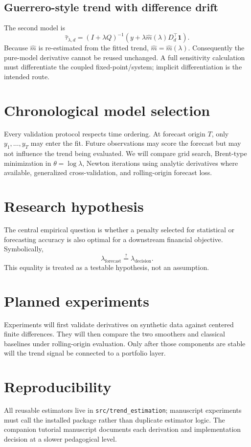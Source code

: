 \documentclass[11pt]{article}
\newcommand{\Dt}{D_d}
\begin{document}
\subsection{Guerrero-style trend with difference drift}
The second model is
\begin{equation}
\widehat\tau_{\lambda,d}
=(I+\lambda Q)^{-1}
\left(y+\lambda\widehat m(\lambda)\Dt^\top\mathbf 1\right).
\end{equation}
Because $\widehat m$ is re-estimated from the fitted trend,
$\widehat m=\widehat m(\lambda)$. Consequently the pure-model derivative cannot
be reused unchanged. A full sensitivity calculation must differentiate the
coupled fixed-point/system; implicit differentiation is the intended route.

\section{Chronological model selection}
Every validation protocol respects time ordering. At forecast origin $T$, only
$y_1,\ldots,y_T$ may enter the fit. Future observations may score the forecast
but may not influence the trend being evaluated. We will compare grid search,
Brent-type minimization in $\theta=\log\lambda$, Newton iterations using
analytic derivatives where available, generalized cross-validation, and
rolling-origin forecast loss.

\section{Research hypothesis}
The central empirical question is whether a penalty selected for statistical
or forecasting accuracy is also optimal for a downstream financial objective.
Symbolically,
\begin{equation}
\lambda_{\mathrm{forecast}}\overset{?}{=}\lambda_{\mathrm{decision}}.
\end{equation}
This equality is treated as a testable hypothesis, not an assumption.

\section{Planned experiments}
Experiments will first validate derivatives on synthetic data against centered
finite differences. They will then compare the two smoothers and classical
baselines under rolling-origin evaluation. Only after those components are
stable will the trend signal be connected to a portfolio layer.

\section{Reproducibility}
All reusable estimators live in \texttt{src/trend\_estimation}; manuscript
experiments must call the installed package rather than duplicate estimator
logic. The companion tutorial manuscript documents each derivation and
implementation decision at a slower pedagogical level.


\end{document}
